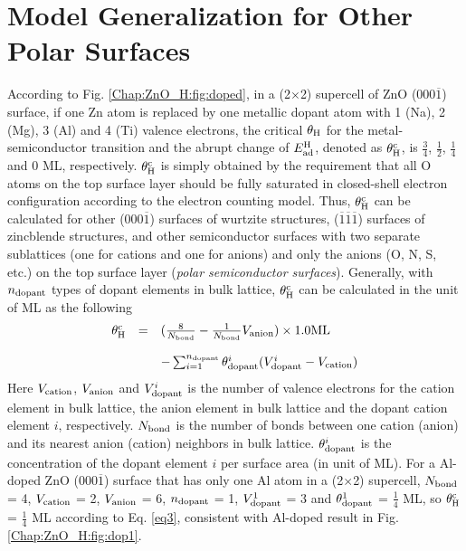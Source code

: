 \section{Model Generalization for Other Polar Surfaces}

According to Fig. \ref{Chap:ZnO_H:fig:doped}, in a (2$\times$2) supercell of ZnO (000$\overline{1}$) surface, if one Zn atom is replaced by one metallic dopant atom with 1 (Na), 2 (Mg), 3 (Al) and 4 (Ti) valence electrons, the critical $\theta_{\textup{H}}$ for the metal-semiconductor transition and the abrupt change of $E_{\textup{ad}}^{\textup{H}}$, denoted as  $\theta_{\textup{H}}^{\textup{c}}$, is $\frac{3}{4}$,  $\frac{1}{2}$, $\frac{1}{4}$ and 0 ML, respectively. $\theta_{\textup{H}}^{\textup{c}}$ is simply obtained by the requirement that all O atoms on the top surface layer should be fully saturated in closed-shell electron configuration according to the electron counting model. Thus, $\theta_{\textup{H}}^{\textup{c}}$ can be calculated for other (000$\overline{1}$) surfaces of wurtzite structures, ($\overline{1}$$\overline{1}$$\overline{1}$) surfaces of zincblende structures, and other semiconductor surfaces with two separate sublattices (one for cations and one for anions) and only the anions (O, N, S, etc.) on the top surface layer (\emph{polar semiconductor surfaces}). Generally, with $n_{\textup{dopant}}$ types of dopant elements in bulk lattice, $\theta_{\textup{H}}^{\textup{c}}$ can be calculated in the unit of ML as the following
\begin{equation}
  \begin{array}{rcl}
      \theta_{\textup{H}}^{\textup{c}}&=&(\frac{8}{N_{\textup{bond}}}-\frac{1}{N_{\textup{bond}}}V_{\textup{anion}})\times1.0\textup{ML}\\\\
      &&-\sum_{i=1}^{n_{\textup{dopant}}}\theta_{\textup{dopant}}^i(V_{\textup{dopant}}^i-V_{\textup{cation}})\\
  \end{array}
  \label{eq3}
\end{equation}
Here $V_{\textup{cation}}$, $V_{\textup{anion}}$ and $V_{\textup{dopant}}^i$ is the number of valence electrons for the cation element in bulk lattice, the anion element in bulk lattice and the dopant cation element $i$, respectively. $N_{\textup{bond}}$ is the number of bonds between one cation (anion) and its nearest anion (cation) neighbors in bulk lattice. $\theta_{\textup{dopant}}^i$ is the concentration of the dopant element $i$ per surface area (in unit of ML). For a Al-doped ZnO (000$\overline{1}$) surface that has only one Al atom in a (2$\times$2) supercell, $N_{\textup{bond}}$ = 4, $V_{\textup{cation}}$ = 2, $V_{\textup{anion}}$ = 6, $n_{\textup{dopant}}$ = 1, $V_{\textup{dopant}}^1$ = 3 and $\theta_{\textup{dopant}}^1$ = $\frac{1}{4}$ ML, so $\theta_{\textup{H}}^{\textup{c}}$ = $\frac{1}{4}$ ML according to Eq. \ref{eq3}, consistent with Al-doped result in Fig. \ref{Chap:ZnO_H:fig:dop1}. 

